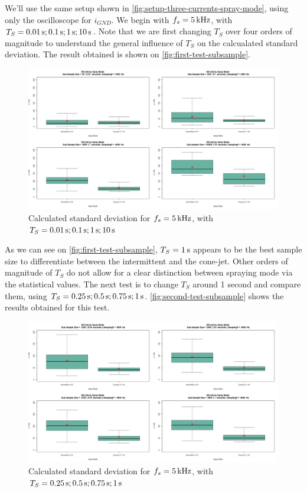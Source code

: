 \documentclass[oneside,12pt]{article}
\begin{document}
We'll use the same setup shown in \autoref{fig:setup-three-currents-spray-mode}, using only the oscilloscope for $i_{GND}$.
We begin with $f_s = 5 \,\mathrm{kHz}$, with $T_S = 0.01 \,\mathrm{s}; 0.1 \,\mathrm{s}; 1 \,\mathrm{s}; 10 \,\mathrm{s}$. Note that we are first changing
$T_S$ over four orders of magnitude to understand the general influence of $T_S$ on the calcualated standard deviation.
The result obtained is shown on \autoref{fig:first-test-subsample}.

\begin{figure}[h!]
    \centering
    \includegraphics[width=\textwidth,trim=1 1 1 1,clip]{figures/first-test-subsample.png}
    \caption{Calculated standard deviation for $f_s = 5 \,\mathrm{kHz}$, with $T_S = 0.01 \,\mathrm{s}; 0.1 \,\mathrm{s}; 1 \,\mathrm{s}; 10 \,\mathrm{s}$}
    \label{fig:first-test-subsample}
\end{figure}

As we can see on \autoref{fig:first-test-subsample}, $T_S = 1 \,\mathrm{s}$ appears to be the best sample size to 
differentiate between the intermittent and the cone-jet. Other orders of magnitude of $T_S$ do not allow for a clear distinction
between spraying mode via the statistical values. The next test is to change $T_S$ around 1 second and compare them, 
using $T_S = 0.25 \,\mathrm{s}; 0.5 \,\mathrm{s}; 0.75 \,\mathrm{s}; 1 \,\mathrm{s}$. \autoref{fig:second-test-subsample} shows the results obtained  
for this test.

\begin{figure}[h!]
    \centering
    \includegraphics[width=\textwidth,trim=1 1 1 1,clip]{figures/second-test-subsample.png}
    \caption{Calculated standard deviation for $f_s = 5 \,\mathrm{kHz}$, with $T_S = 0.25 \,\mathrm{s}; 0.5 \,\mathrm{s}; 0.75 \,\mathrm{s}; 1 \,\mathrm{s}$}
    \label{fig:second-test-subsample}
\end{figure}
\end{document}
